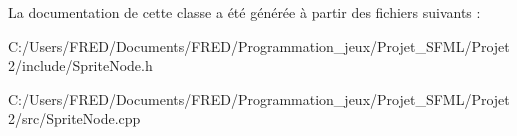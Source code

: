 La documentation de cette classe a été générée à partir des fichiers suivants \+:\begin{DoxyCompactItemize}
\item 
C\+:/\+Users/\+F\+R\+E\+D/\+Documents/\+F\+R\+E\+D/\+Programmation\+\_\+jeux/\+Projet\+\_\+\+S\+F\+M\+L/\+Projet2/include/Sprite\+Node.\+h\item 
C\+:/\+Users/\+F\+R\+E\+D/\+Documents/\+F\+R\+E\+D/\+Programmation\+\_\+jeux/\+Projet\+\_\+\+S\+F\+M\+L/\+Projet2/src/Sprite\+Node.\+cpp\end{DoxyCompactItemize}
